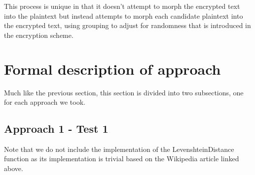 \documentclass[12pt]{article}
\begin{document}
This process is unique in that it doesn't attempt to morph the encrypted text into the plaintext but instead attempts to morph each candidate plaintext into the encrypted text, using grouping to adjust for randomness that is introduced in the encryption scheme.


\section{Formal description of approach}
Much like the previous section, this section is divided into two subsections, one for each approach we took.
\subsection{Approach 1 - Test 1}
Note that we do not include the implementation of the LevenshteinDistance function as its implementation is trivial based on the Wikipedia article linked above.
\end{document}
